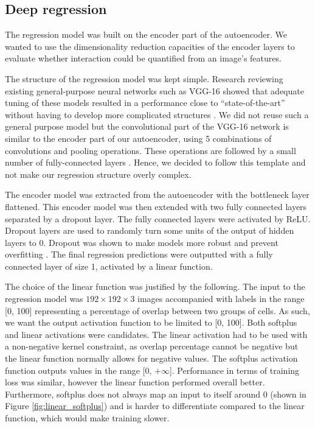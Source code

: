 \subsection{Deep regression}

The regression model was built on the encoder part of the autoencoder. We wanted to use the dimensionality reduction capacities of the encoder layers to evaluate whether interaction could be quantified from an image's features. 

The structure of the regression model was kept simple. Research reviewing existing general-purpose neural networks such as VGG-16 showed that adequate tuning of these models resulted in a performance close to ``state-of-the-art'' without having to develop more complicated structures \citep{Lathu2018}. We did not reuse such a general purpose model but the convolutional part of the VGG-16 network is similar to the encoder part of our autoencoder, using 5 combinations of convolutions and pooling operations. These operations are followed by a small number of fully-connected layers \citep{Simonyan15}. Hence, we decided to follow this template and not make our regression structure overly complex.

The encoder model was extracted from the autoencoder with the bottleneck layer flattened. This encoder model was then extended with two fully connected layers separated by a dropout layer. The fully connected layers were activated by ReLU. Dropout layers are used to randomly turn some units of the output of hidden layers to 0. Dropout was shown to make models more robust and prevent overfitting \citep{hinton_improving_2012}. The final regression predictions were outputted with a fully connected layer of size 1, activated by a linear function. 

The choice of the linear function was justified by the following. The input to the regression model was $192\times192\times3$ images accompanied with labels in the range [0, 100] representing a percentage of overlap between two groups of cells. As such, we want the output activation function to be limited to [0, 100]. Both softplus and linear activations were candidates. The linear activation had to be used with a non-negative kernel constraint, as overlap percentage cannot be negative but the linear function normally allows for negative values. The softplus activation function outputs values in the range [0, $+\infty$]. Performance in terms of training loss was similar, however the linear function performed overall better. Furthermore, softplus does not always map an input to itself around 0 (shown in Figure \ref{fig:linear_softplus}) and is harder to differentiate compared to the linear function, which would make training slower.  


